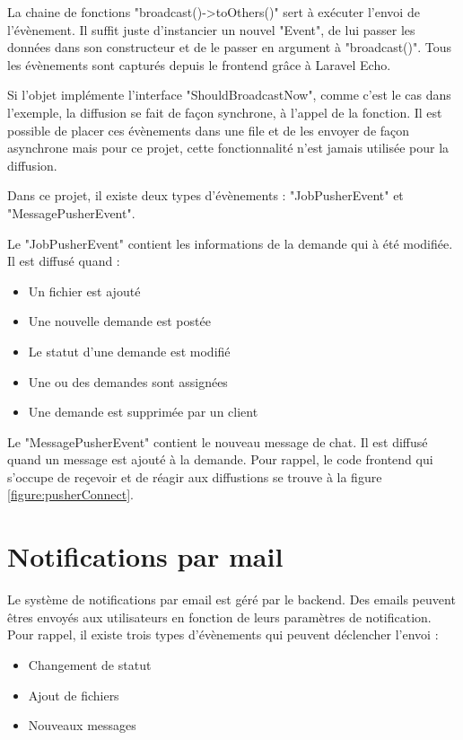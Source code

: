 \documentclass[
    iai, %
    eai, %
]{heig-tb}
\begin{document}
La chaine de fonctions "broadcast()->toOthers()" sert à exécuter l'envoi de l'évènement. Il suffit juste d'instancier un nouvel "Event", de lui passer les données dans son constructeur et de le passer en argument à "broadcast()". Tous les évènements sont capturés depuis le frontend grâce à Laravel Echo.

Si l'objet implémente l'interface "ShouldBroadcastNow", comme c'est le cas dans l'exemple, la diffusion se fait de façon synchrone, à l'appel de la fonction. Il est possible de placer ces évènements dans une file et de les envoyer de façon asynchrone mais pour ce projet, cette fonctionnalité n'est jamais utilisée pour la diffusion.

Dans ce projet, il existe deux types d'évènements : "JobPusherEvent" et "MessagePusherEvent".

Le "JobPusherEvent" contient les informations de la demande qui à été modifiée. Il est diffusé quand :
\begin{itemize}
  \item Un fichier est ajouté
  \item Une nouvelle demande est postée
  \item Le statut d'une demande est modifié
  \item Une ou des demandes sont assignées
  \item Une demande est supprimée par un client
\end{itemize}
\bigskip

Le "MessagePusherEvent" contient le nouveau message de chat. Il est diffusé quand un message est ajouté à la demande. Pour rappel, le code frontend qui s'occupe de reçevoir et de réagir aux diffustions se trouve à la figure \ref{figure:pusherConnect}.

\newpage
\section{Notifications par mail}
Le système de notifications par email est géré par le backend. Des emails peuvent êtres envoyés aux utilisateurs en fonction de leurs paramètres de notification.
Pour rappel, il existe trois types d'évènements qui peuvent déclencher l'envoi :
\begin{itemize}
  \item Changement de statut
  \item Ajout de fichiers
  \item Nouveaux messages
\end{itemize}
\bigskip
\end{document}
